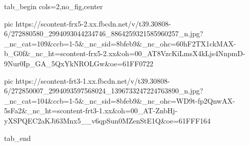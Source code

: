  
 
 
 
 


\ifcmt
  tab_begin cols=2,no_fig,center

     pic https://scontent-frx5-2.xx.fbcdn.net/v/t39.30808-6/272880580_2994093044234746_8864259321585960257_n.jpg?_nc_cat=109&ccb=1-5&_nc_sid=8bfeb9&_nc_ohc=60hF2TX1ckMAX-b_G0f&_nc_ht=scontent-frx5-2.xx&oh=00_AT8VzcKiLmsX4kLjs4NnpmD-9Nur0Ip_GA_5QxYkNROLGw&oe=61FF0722

     pic https://scontent-frt3-1.xx.fbcdn.net/v/t39.30808-6/272850007_2994093597568024_1396733247224763890_n.jpg?_nc_cat=104&ccb=1-5&_nc_sid=8bfeb9&_nc_ohc=WD9t-fp2QnwAX-5sFa2&_nc_ht=scontent-frt3-1.xx&oh=00_AT-ZnbHj-yXSPQEC2aKJi63Mnx5__v6qpSun0MZenStE1Q&oe=61FFF164

  tab_end
\fi
